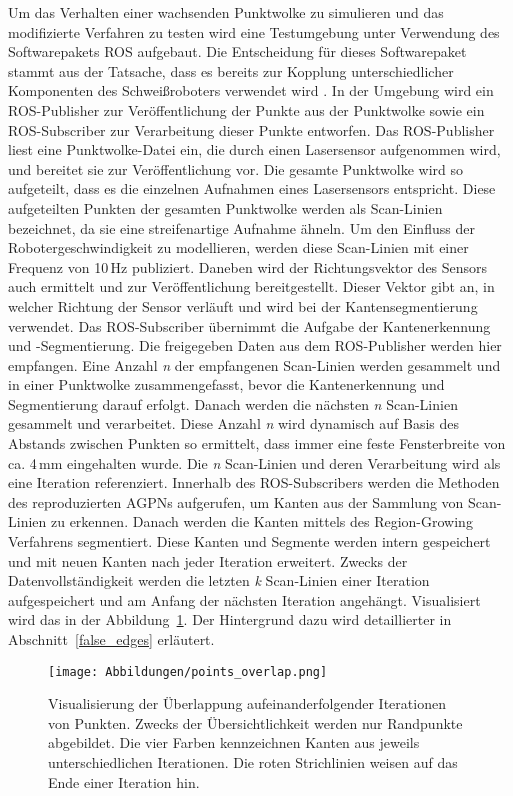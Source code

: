 Um das Verhalten einer wachsenden Punktwolke zu simulieren und das modifizierte Verfahren zu testen wird eine Testumgebung unter Verwendung des Softwarepakets ROS aufgebaut. Die Entscheidung für dieses Softwarepaket stammt aus der Tatsache, dass es bereits zur Kopplung unterschiedlicher Komponenten des Schweißroboters verwendet wird \autocite[39]{savla_intelligente_2022}. In der Umgebung wird ein ROS-Publisher zur Veröffentlichung der Punkte aus der Punktwolke sowie ein ROS-Subscriber zur Verarbeitung dieser Punkte entworfen. Das ROS-Publisher liest eine Punktwolke-Datei ein, die durch einen Lasersensor aufgenommen wird, und bereitet sie zur Veröffentlichung vor. Die gesamte Punktwolke wird so aufgeteilt, dass es die einzelnen Aufnahmen eines Lasersensors entspricht. Diese aufgeteilten Punkten der gesamten Punktwolke werden als Scan-Linien bezeichnet, da sie eine streifenartige Aufnahme ähneln. Um den Einfluss der Robotergeschwindigkeit zu modellieren, werden diese Scan-Linien mit einer Frequenz von 10\,Hz publiziert. Daneben wird der Richtungsvektor des Sensors auch ermittelt und zur Veröffentlichung bereitgestellt. Dieser Vektor gibt an, in welcher Richtung der Sensor verläuft und wird bei der Kantensegmentierung verwendet. Das ROS-Subscriber übernimmt die Aufgabe der Kantenerkennung und -Segmentierung. Die freigegeben Daten aus dem ROS-Publisher werden hier empfangen. Eine Anzahl \textit{n} der empfangenen Scan-Linien werden gesammelt und in einer Punktwolke zusammengefasst, bevor die Kantenerkennung und Segmentierung darauf erfolgt. Danach werden die nächsten \textit{n} Scan-Linien gesammelt und verarbeitet. Diese Anzahl \textit{n} wird dynamisch auf Basis des Abstands zwischen Punkten so ermittelt, dass immer eine feste Fensterbreite von ca. 4\,mm eingehalten wurde. Die \textit{n} Scan-Linien und deren Verarbeitung wird als eine Iteration referenziert. Innerhalb des ROS-Subscribers werden die Methoden des reproduzierten AGPNs aufgerufen, um Kanten aus der Sammlung von Scan-Linien zu erkennen. Danach werden die Kanten mittels des Region-Growing Verfahrens segmentiert. Diese Kanten und Segmente werden intern gespeichert und mit neuen Kanten nach jeder Iteration erweitert. Zwecks der Datenvollständigkeit werden die letzten \textit{k} Scan-Linien einer Iteration aufgespeichert und am Anfang der nächsten Iteration angehängt. Visualisiert wird das in der Abbildung~\ref{fig: point_overlap}. Der Hintergrund dazu wird detaillierter in Abschnitt~\ref{false_edges} erläutert.

\begin{figure}[h]
	\texttt{[image: Abbildungen/points\_overlap.png]}
	\centering
	\caption[Überlappungen der Punkte zwischen zwei Regionen]{Visualisierung der Überlappung aufeinanderfolgender Iterationen von Punkten. Zwecks der Übersichtlichkeit werden nur Randpunkte abgebildet. Die vier Farben kennzeichnen Kanten aus jeweils unterschiedlichen Iterationen. Die roten Strichlinien weisen auf das Ende einer Iteration hin.}
	\label{fig: point_overlap}
\end{figure}

